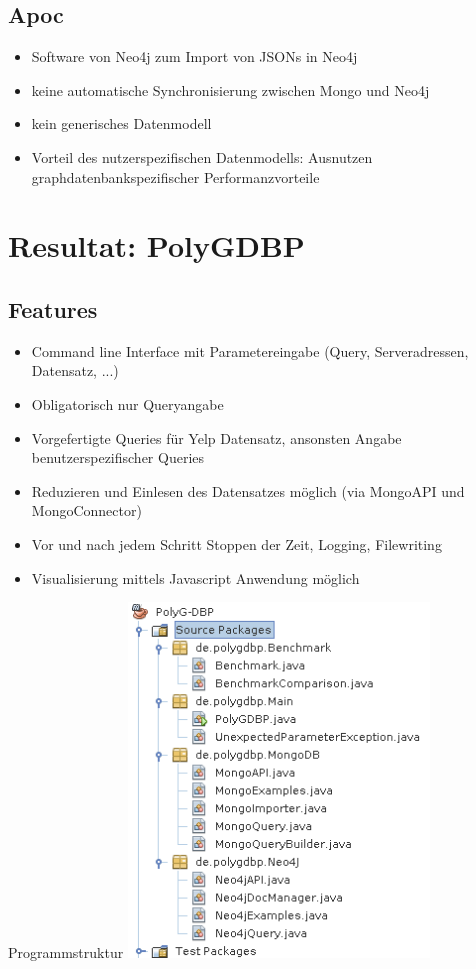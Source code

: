 \documentclass[12pt,usenames,dvipsnames]{beamer}
\begin{document}
\subsection{Apoc}
\begin{frame}
\begin{itemize}[<+- | alert@+>]
\item Software von Neo4j zum Import von JSONs in Neo4j
\item keine automatische Synchronisierung zwischen Mongo und Neo4j
\item kein generisches Datenmodell
\item Vorteil des nutzerspezifischen Datenmodells: Ausnutzen graphdatenbankspezifischer Performanzvorteile
\end{itemize}

\end{frame}
\section{Resultat: PolyGDBP}
\subsection{Features}
\begin{frame}
\begin{itemize}[<+- | alert@+>]
\item Command line Interface mit Parametereingabe (Query, Serveradressen, Datensatz, ...)
\item Obligatorisch nur Queryangabe 
\item Vorgefertigte Queries für Yelp Datensatz, ansonsten Angabe benutzerspezifischer Queries
\item Reduzieren und Einlesen des Datensatzes möglich (via MongoAPI und MongoConnector)
\item Vor und nach jedem Schritt Stoppen der Zeit, Logging, Filewriting
\item Visualisierung mittels Javascript Anwendung möglich
\end{itemize}
\end{frame}
\begin{frame}{Programmstruktur}
\includegraphics[width=0.6\textwidth]{files}

\end{frame}
\end{document}
